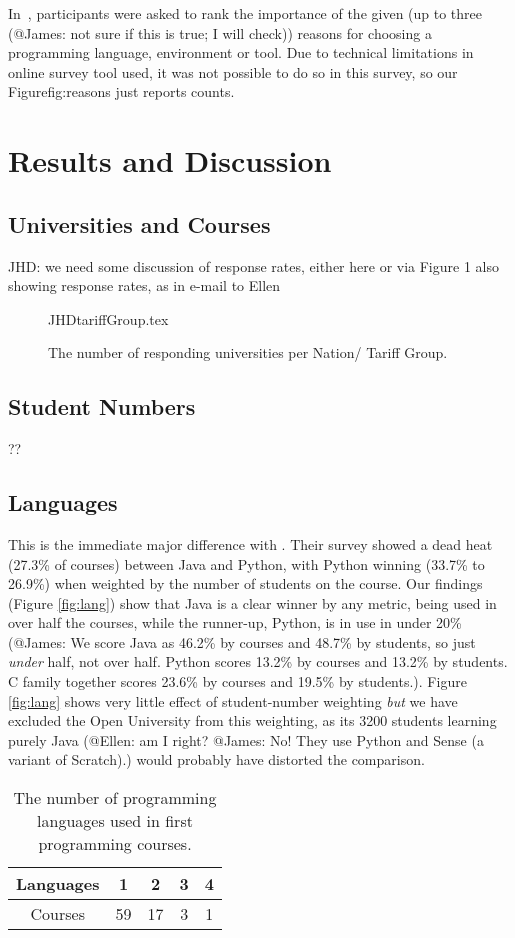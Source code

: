 \documentclass{sig-alternate}
\begin{document}
In~\cite{mason+cooper:2014}, participants were asked to rank the importance of the given (up to three (@James: not sure if this is true; I will check)) reasons for choosing a programming language, environment or tool. Due to technical limitations in online survey tool used, it was not possible to do so in this survey, so our Figure{fig:reasons} just reports counts.

\section{Results and Discussion}\label{results}

\subsection{Universities and Courses}
JHD: we need some discussion of response rates, either here or via Figure 1 also showing response rates, as in e-mail to Ellen
\begin{figure}
\begin{center}
{JHDtariffGroup.tex}\vskip-12pt
\caption{The number of responding universities per Nation/   
 Tariff Group.}
\end{center}
\end{figure}

\subsection{Student Numbers}
??
\subsection{Languages}
This is the immediate major difference with \cite{mason+cooper:2014}. Their survey showed a dead heat (27.3\% of courses) between Java and Python, with Python winning (33.7\% to 26.9\%) when weighted by the number of students on the course.  Our findings  (Figure \ref{fig:lang}) show that Java is a clear winner by any metric, being used in over half the courses, while the runner-up, Python, is in use in under 20\% (@James: We score Java as 46.2\% by courses and 48.7\% by students, so just \emph{under} half, not over half. Python scores 13.2\% by courses and 13.2\% by students. C family together scores 23.6\% by courses and 19.5\% by students.). Figure \ref{fig:lang} shows very little effect of student-number weighting \emph{but} we have excluded the Open University from this weighting, as its 3200 students learning purely Java (@Ellen: am I right? @James: No! They use Python and Sense (a variant of Scratch).) would probably have distorted the comparison.
\begin{table}[]
\centering
\caption{The number of programming languages used in first programming courses.}
\label{tab:numLanguages}
\begin{tabular}{ccccc}
\hline
Languages & 1  & 2  & 3 & 4 \\ \hline
Courses   & 59 & 17 & 3 & 1 \\ \hline
\end{tabular}
\end{table}
\end{document}
